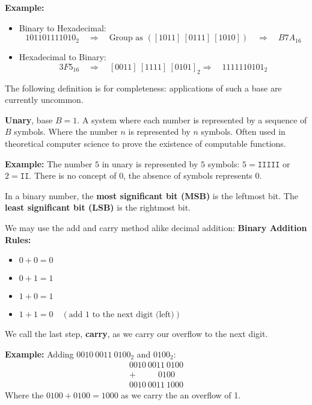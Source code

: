 \newpage

\noindent
\textbf{Example:}
    \begin{itemize}
        \item Binary to Hexadecimal:
        \[
        101101111010_2 \quad \Rightarrow \quad \text{Group as } ([1011] \ [0111] \ [1010]) \quad \Rightarrow \quad B7A_{16}
        \]
        \item Hexadecimal to Binary:
        \[
        3F5_{16} \quad \Rightarrow \quad [0011]\ [1111]\ [0101]_2 \Rightarrow \quad 1111110101_2
        \]
        \noindent
    \end{itemize}
    \noindent
The following definition is for completeness: applications of such a base are currently uncommon.
\begin{Def}[Unary]
    
    \textbf{Unary}, base $B=1$. A system where each number is represented by a sequence of $B$ symbols. Where the number $n$ is represented by $n$ symbols. Often used in theoretical computer science to prove the existence of computable functions.
\end{Def}
\noindent
\textbf{Example:} The number $5$ in unary is represented by $5$ symbols: $5 = \texttt{IIIII}$ or $2= \texttt{II}$. There is no concept of 0, the absence of symbols represents 0.\\
\begin{Def}
    
    In a binary number, the \textbf{most significant bit (MSB)} is the leftmost bit. The \textbf{least significant bit (LSB)} is the rightmost bit.
\end{Def}

\begin{theo}

    We may use the add and carry method alike decimal addition:
    \textbf{Binary Addition Rules:}
    \begin{itemize}
        \item $0 + 0 = 0$
        \item $0 + 1 = 1$
        \item $1 + 0 = 1$
        \item $1 + 1 = 0 \quad (\text{add 1 to the next digit (left)})$
    \end{itemize}
    \noindent
    We call the last step, \textbf{carry}, as we carry our overflow to the next digit.
\end{theo}
    \newpage

    \noindent
    \textbf{Example:} Adding $0010\ 0011\ 0100_2$ and $0100_2$:
    \[
    \begin{array}{r}
    0010\ 0011\ 0100 \\
    + \quad\quad\ \ \ 0100 \\
    \hline
    0010\ 0011\ 1000
    \end{array}
    \]
\noindent
Where the $0100+0100=1000$ as we carry the an overflow of 1. 

